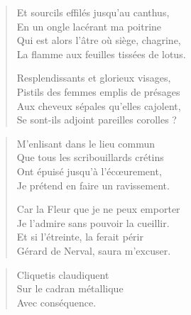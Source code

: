 \begin{textblock*}{8cm}
\begin{verse}
  Et sourcils effilés jusqu’au canthus,\\  %
  En un ongle lacérant ma poitrine\\  %
  Qui est alors l’âtre où siège, chagrine,\\  %
  La flamme aux feuilles tissées de lotus.

  Resplendissants et glorieux visages,\\  %
  Pistils des femmes emplis de présages\\  %
  Aux cheveux sépales qu’elles cajolent,\\  %
  Se sont-ils adjoint pareilles corolles ?
\end{verse}
\end{textblock*}



\begin{verse}\quatrain
  M’enlisant dans le lieu commun\\  %
  Que tous les scribouillards crétins\\  %
  Ont épuisé jusqu’à l’écœurement,\\  %
  Je prétend en faire un ravissement.  %

  Car la Fleur que je ne peux emporter\\  %
  Je l’admire  sans pouvoir la cueillir.\\  %
  Et si l’étreinte,  la ferait périr\\  %
  Gérard de Nerval, saura m’excuser.  %
\end{verse}


\begin{verse}\haiku
  Cliquetis claudiquent\\  %
  Sur le cadran métallique\\  %
  Avec conséquence.
\end{verse}

